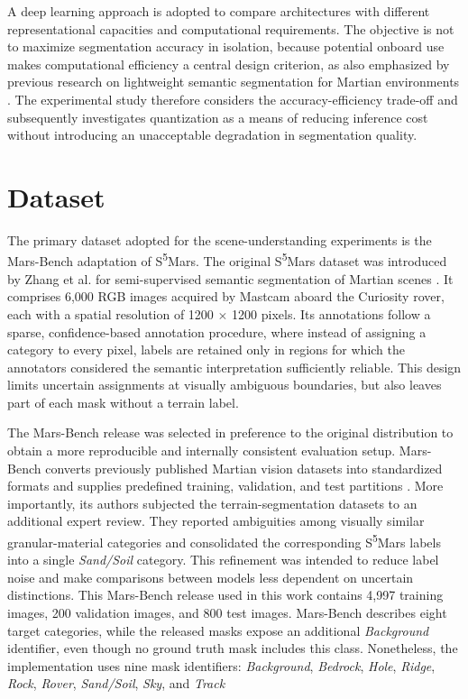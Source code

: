 A deep learning approach is adopted to compare architectures with different representational capacities and computational requirements. The objective is not to maximize segmentation accuracy in isolation, because potential onboard use makes computational efficiency a central design criterion, as also emphasized by previous research on lightweight semantic segmentation for Martian environments \cite{xiong2024light4mars}. The experimental study therefore considers the accuracy-efficiency trade-off and subsequently investigates quantization as a means of reducing inference cost without introducing an unacceptable degradation in segmentation quality.

\section{Dataset}
The primary dataset adopted for the scene-understanding experiments is the Mars-Bench adaptation of S\textsuperscript{5}Mars. The original S\textsuperscript{5}Mars dataset was introduced by Zhang et al. for semi-supervised semantic segmentation of Martian scenes \cite{zhang2024s5mars}. It comprises 6,000 RGB images acquired by Mastcam aboard the Curiosity rover, each with a spatial resolution of 1200 \(\times\) 1200 pixels. Its annotations follow a sparse, confidence-based annotation procedure, where instead of assigning a category to every pixel, labels are retained only in regions for which the annotators considered the semantic interpretation sufficiently reliable. This design limits uncertain assignments at visually ambiguous boundaries, but also leaves part of each mask without a terrain label.

The Mars-Bench release was selected in preference to the original distribution to obtain a more reproducible and internally consistent evaluation setup. Mars-Bench converts previously published Martian vision datasets into standardized formats and supplies predefined training, validation, and test partitions \cite{purohit2025marsbench}. More importantly, its authors subjected the terrain-segmentation datasets to an additional expert review. They reported ambiguities among visually similar granular-material categories and consolidated the corresponding S\textsuperscript{5}Mars labels into a single \emph{Sand/Soil} category. This refinement was intended to reduce label noise and make comparisons between models less dependent on uncertain distinctions. This Mars-Bench release used in this work contains 4,997 training images, 200 validation images, and 800 test images. Mars-Bench describes eight target categories, while the released masks expose an additional \emph{Background} identifier, even though no ground truth mask includes this class. Nonetheless, the implementation uses nine mask identifiers: \emph{Background}, \emph{Bedrock}, \emph{Hole}, \emph{Ridge}, \emph{Rock}, \emph{Rover}, \emph{Sand/Soil}, \emph{Sky}, and \emph{Track}

